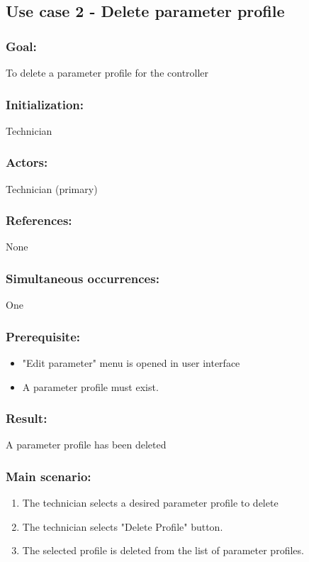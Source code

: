 \begin{framed}
	\subsection{Use case 2 - Delete parameter profile}
	\subsubsection*{Goal:}
	To delete a parameter profile for the controller
	
	\subsubsection*{Initialization:}
	Technician
	
	\subsubsection*{Actors:}
	Technician (primary)
	
	\subsubsection*{References:}
	None
	
	\subsubsection*{Simultaneous occurrences:}
	One
	
	\subsubsection*{Prerequisite:}
	\begin{itemize}
		\item "Edit parameter" menu is opened in user interface
		\item A parameter profile must exist.
	\end{itemize}
	
	\subsubsection*{Result:}
	A parameter profile has been deleted
	
	\subsubsection*{Main scenario:}
	\begin{enumerate}
		\item The technician selects a desired parameter profile to delete
		\item The technician selects "Delete Profile" button.
		\item The selected profile is deleted from the list of parameter profiles.
	\end{enumerate}	
	

\end{framed}
